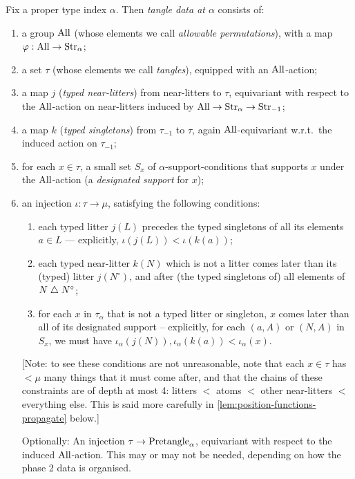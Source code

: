 \begin{definition}
  \label{def:tangle-data}

  Fix a proper type index $\alpha$.  Then \emph{tangle data at $\alpha$} consists of:
  \begin{enumerate}
    \item a group $\mathrm{All}$ (whose elements we call \emph{allowable permutations}), with a map $\varphi : \mathrm{All} \to \mathrm{Str}_\alpha$;
    \item a set $\tau$ (whose elements we call \emph{tangles}), equipped with an $\mathrm{All}$-action;
    \item a map $j$ (\emph{typed near-litters}) from near-litters to $\tau$, equivariant with respect to the $\mathrm{All}$-action on near-litters induced by $\mathrm{All} \to \mathrm{Str}_{\alpha} \to \mathrm{Str}_{-1}$;
    \item a map $k$ (\emph{typed singletons}) from $\tau_{-1}$ to $\tau$, again $\mathrm{All}$-equivariant w.r.t.\ the induced action on $\tau_{-1}$;
    \item for each $x \in \tau$, a small set $S_x$ of $\alpha$-support-conditions that supports $x$ under the $\mathrm{All}$-action (a \emph{designated support} for $x$);
    \item an injection $\iota : \tau \to \mu$, satisfying the following conditions:
    \begin{enumerate}
      \item each typed litter $j(L)$ precedes the typed singletons of all its elements $a \in L$ --- explicitly, $\iota(j(L)) < \iota(k(a))$;

      \item each typed near-litter $k(N)$ which is not a litter comes later than its (typed) litter $j(N^\circ)$, and after (the typed singletons of) all elements of $N \mathrel{\triangle} N^\circ$;

      \item for each $x$ in $\tau_\alpha$ that is not a typed litter or singleton, $x$ comes later than all of its designated support -- explicitly, for each $(a,A)$ or $(N,A)$ in $S_x$, we must have $\iota_\alpha(j(N)), \iota_\alpha(k(a))<\iota_\alpha(x)$.
    \end{enumerate}
    [Note: to see these conditions are not unreasonable, note that each $x \in \tau$ has $<\mu$ many things that it must come after, and that the chains of these constraints are of depth at most 4: litters $<$ atoms $<$ other near-litters $<$ everything else.  This is said more carefully in \cref{lem:position-functions-propagate} below.]
    \item [Optionally: An injection $\tau \to \mathrm{Pretangle}_\alpha$, equivariant with respect to the induced $\mathrm{All}$-action.  This may or may not be needed, depending on how the phase 2 data is organised.]
  \end{enumerate}


\end{definition}
